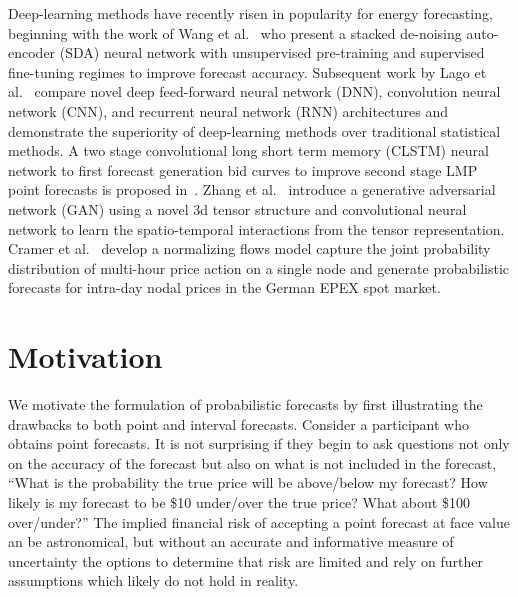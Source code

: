 Deep-learning methods have recently risen in popularity for energy forecasting, beginning with the work of
Wang et al.~\cite{7744689} who present a stacked de-noising auto-encoder (SDA) neural network with unsupervised
pre-training and supervised fine-tuning regimes to improve forecast accuracy.
Subsequent work by Lago et al.~\cite{LAGO2018386} compare novel deep feed-forward neural network (DNN),
convolution neural network (CNN), and recurrent neural network (RNN) architectures and demonstrate the superiority of
deep-learning methods over traditional statistical methods.
A two stage convolutional long short term memory (CLSTM) neural network to first
forecast generation bid curves to improve second stage LMP point forecasts is proposed in~\cite{9916722}.
Zhang et al.~\cite{9520248} introduce a generative adversarial network (GAN) using a novel 3d tensor structure and
convolutional neural network to learn the spatio-temporal interactions from the tensor representation.
Cramer et al.~\cite{48550} develop a normalizing flows model capture the joint probability distribution of multi-hour price
action on a single node and generate probabilistic forecasts for intra-day nodal prices in the German EPEX spot market.

\section{Motivation}\label{sec:motivation}

We motivate the formulation of probabilistic forecasts by first illustrating the drawbacks to both point and interval
forecasts.
Consider a participant who obtains point forecasts.
It is not surprising if they begin to ask questions not only on the accuracy of the forecast but also on what is not
included in the forecast, ``What is the probability the true price will be above/below my forecast?
How likely is my forecast to be \$10 under/over the true price?
What about \$100 over/under?''
The implied financial risk of accepting a point forecast at face value an be astronomical, but without an accurate and
informative measure of uncertainty the options to determine that risk are limited and rely on further assumptions which
likely do not hold in reality.

